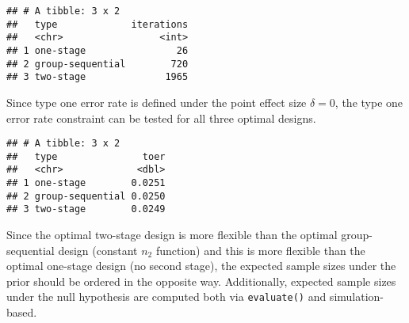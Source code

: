 \documentclass[
]{book}
\newenvironment{Shaded}{\begin{snugshade}}{\end{snugshade}}
\newcommand{\DataTypeTok}[1]{\textcolor[rgb]{0.13,0.29,0.53}{#1}}
\newcommand{\DecValTok}[1]{\textcolor[rgb]{0.00,0.00,0.81}{#1}}
\newcommand{\FloatTok}[1]{\textcolor[rgb]{0.00,0.00,0.81}{#1}}
\newcommand{\KeywordTok}[1]{\textcolor[rgb]{0.13,0.29,0.53}{\textbf{#1}}}
\newcommand{\NormalTok}[1]{#1}
\newcommand{\OperatorTok}[1]{\textcolor[rgb]{0.81,0.36,0.00}{\textbf{#1}}}
\newcommand{\StringTok}[1]{\textcolor[rgb]{0.31,0.60,0.02}{#1}}
\begin{document}
\begin{verbatim}
## # A tibble: 3 x 2
##   type             iterations
##   <chr>                 <int>
## 1 one-stage                26
## 2 group-sequential        720
## 3 two-stage              1965
\end{verbatim}

Since type one error rate is defined under the point effect size \(\delta=0\),
the type one error rate constraint can be tested for all three optimal designs.

\begin{Shaded}
\end{Shaded}

\begin{verbatim}
## # A tibble: 3 x 2
##   type               toer
##   <chr>             <dbl>
## 1 one-stage        0.0251
## 2 group-sequential 0.0250
## 3 two-stage        0.0249
\end{verbatim}

Since the optimal two-stage design is more flexible than the optimal
group-sequential design (constant \(n_2\) function) and this is
more flexible than the optimal one-stage design (no second stage),
the expected sample sizes under the prior should be ordered in the opposite way.
Additionally, expected sample sizes under the null hypothesis
are computed both via \texttt{evaluate()} and simulation-based.
\end{document}
